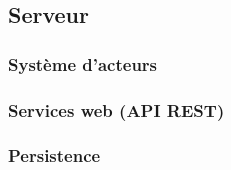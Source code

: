 \subsection{Serveur}
\subsubsection{Système d'acteurs}\label{systeme-acteurs}
\subsubsection{Services web (API REST)}
\subsubsection{Persistence}